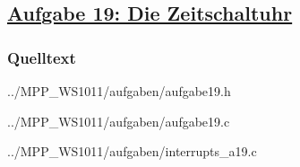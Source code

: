 \subsection*
{\href{http://cst.mi.fu-berlin.de/intern/19606-P-MPP/Aufgaben/040603.html}
{Aufgabe 19: Die Zeitschaltuhr}}

\subsubsection*{Quelltext}

{../MPP_WS1011/aufgaben/aufgabe19.h}


{../MPP_WS1011/aufgaben/aufgabe19.c}


{../MPP_WS1011/aufgaben/interrupts_a19.c}
